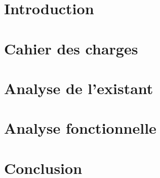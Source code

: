\documentclass[a4paper,12pt]{article}
\begin{document}
\tableofcontents
\newpage

\section{Introduction}
\newpage

\section{Cahier des charges}
\newpage

\section{Analyse de l'existant}
\newpage

\section{Analyse fonctionnelle}
\newpage

\section{Conclusion}

\newpage

\newpage
\listoffigures
\end{document}
